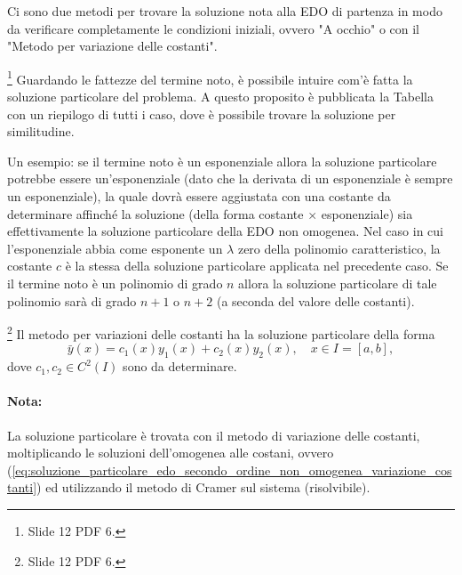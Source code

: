 Ci sono due metodi per trovare la soluzione nota alla EDO di partenza in modo da verificare completamente le condizioni iniziali, ovvero "A occhio" o con il "Metodo per variazione delle costanti".

\label{ssec:metodo_somiglianza}
\footnote{Slide 12 PDF 6.}
Guardando le fattezze del termine noto, è possibile intuire com'è fatta la soluzione particolare del problema. A questo proposito è pubblicata la Tabella con un riepilogo di tutti i caso, dove è possibile trovare la soluzione per similitudine.

\noindent Un esempio: se il termine noto è un esponenziale allora la soluzione particolare potrebbe essere un'esponenziale (dato che la derivata di un esponenziale è sempre un esponenziale), la quale dovrà essere aggiustata con una costante da determinare affinché la soluzione (della forma costante $\times$ esponenziale) sia effettivamente la soluzione particolare della EDO non omogenea. Nel caso in cui l'esponenziale abbia come esponente un $\lambda$ zero della polinomio caratteristico, la costante $c$ è la stessa della soluzione particolare applicata nel precedente caso. Se il termine noto è un polinomio di grado $n$ allora la soluzione particolare di tale polinomio sarà di grado $n+1$ o $n+2$ (a seconda del valore delle costanti).

\label{ssec:variazione_costanti}
\footnote{Slide 12 PDF 6.}
Il metodo per variazioni delle costanti ha la soluzione particolare della forma
\begin{equation}\label{eq:soluzione_particolare_edo_secondo_ordine_non_omogenea_variazione_costanti}
	\bar{y}(x) = c_1(x) y_1(x) + c_2(x) y_2(x),\quad x\in I=[a,b],
\end{equation}
dove $c_1,c_2\in C^2(I)$ sono da determinare.

\paragraph{Nota:} La soluzione particolare è trovata con il metodo di variazione delle costanti, moltiplicando le soluzioni dell'omogenea alle costani, ovvero (\ref{eq:soluzione_particolare_edo_secondo_ordine_non_omogenea_variazione_costanti}) ed utilizzando il metodo di Cramer sul sistema (risolvibile).


